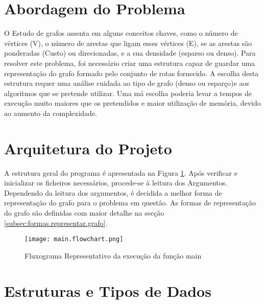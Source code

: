 \documentclass[14pt]{article}
\begin{document}
    \section{Abordagem do Problema} \label{sec:abordagem.problema} 
    O Estudo de grafos assenta em alguns conceitos chaves, como o número de vértices (V), o número de arestas que ligam
    esses vértices (E), se as arestas são ponderadas (Custo) ou direcionadas, e a sua densidade (esparso ou denso).
    Para resolver este problema, foi necessário criar uma estrutura capaz de guardar uma representação do grafo formado
    pelo conjunto de rotas fornecido.
    A escolha desta estrutura requer uma análise cuidada ao tipo de grafo (denso ou esparço)e aos algoritmos que se
    pretende utilizar.
    Uma má escolha poderia levar a tempos de execução muito maiores que os pretendidos e maior utilização de memória,
    devido ao aumento da complexidade.

    \section{Arquitetura do Projeto}\label{arquitetura.projeto} 
    A estrutura geral do programa é apresentada na Figura \ref{fig:main.flowchart}.
    Após verificar e inicializar os ficheiros necessários, procede-se à leitura dos Argumentos.
    Dependendo da leitura dos argumentos, é decidida a melhor forma de representação do grafo para o problema
    em questâo.
    As formas de representação do grafo são definidas com maior detalhe na secção \ref{subsec:formas.representar.grafo}.
\vfill
    \begin{figure}[H]
        \centering
        \label{fig:main.flowchart}
        \texttt{[image: main.flowchart.png]}
        \caption{Fluxograma Representativo da execução da função main}
    \end{figure}
\vfill
    \newpage

    \section{Estruturas e Tipos de Dados}\label{sec:estruturas.tipos.dados} 
\end{document}
